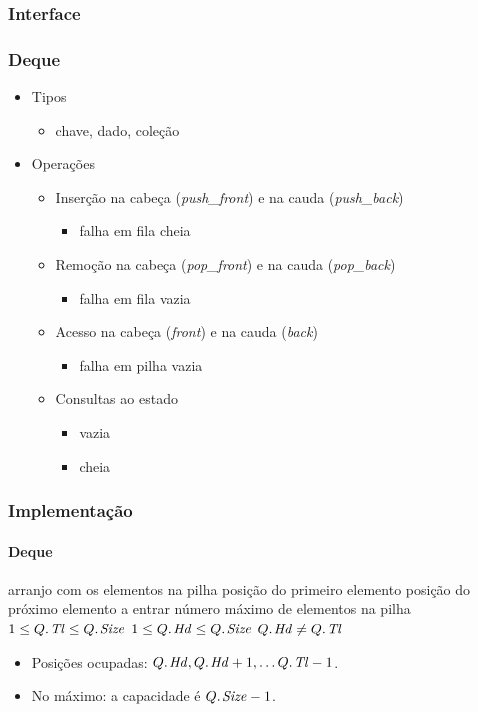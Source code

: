 \documentclass{beamer}
\begin{document}
\begin{frame}
  \frametitle{Interface}
  \frametitle{Deque}

  \begin{itemize}
    \item Tipos
      \begin{itemize}
        \item chave, dado, coleção
      \end{itemize}
    \item Operações
      \begin{itemize}
        \item Inserção na cabeça (\textit{push\_front\/}) e na cauda (\textit{push\_back\/})
          \begin{itemize}
            \item falha em fila cheia
          \end{itemize}
        \item Remoção na cabeça (\textit{pop\_front\/}) e na cauda (\textit{pop\_back\/})
          \begin{itemize}
            \item falha em fila vazia
          \end{itemize}
        \item Acesso na cabeça (\textit{front\/}) e na cauda (\textit{back\/})
          \begin{itemize}
            \item falha em pilha vazia
          \end{itemize}
        \item Consultas ao estado
          \begin{itemize}
          \item vazia
          \item cheia
          \end{itemize}
      \end{itemize}
  \end{itemize}
\end{frame}

\begin{frame}

  \frametitle{Implementação}
  \framesubtitle{Deque}

  \begin{codebox}
    \zi {} \> \> \> \Comment arranjo com os elementos na pilha
    \zi {}   \> \> \> \Comment posição do primeiro elemento
    \zi {}   \> \> \> \Comment posição do próximo elemento a entrar
    \zi {} \> \> \> \Comment número máximo de elementos na pilha
    \zi $1 \le \attrib{Q}{Tl} \le \attrib{Q}{Size}$
    \zi $1 \le \attrib{Q}{Hd} \le \attrib{Q}{Size}$
    \zi $\attrib{Q}{Hd} \neq \attrib{Q}{Tl}$
  \end{codebox}
  \begin{itemize}
  \item Posições ocupadas: $\attrib{Q}{Hd}, \attrib{Q}{Hd}+1, \ldots
  \attrib{Q}{Tl}-1$.
  \item No máximo: a capacidade é $\attrib{Q}{Size} - 1$.
  \end{itemize}
  
\end{frame}
\end{document}
